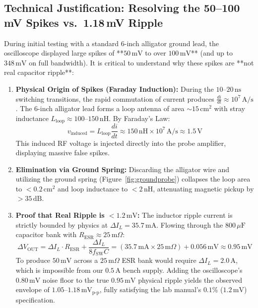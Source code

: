 \documentclass[11pt,a4paper]{article}
\begin{document}
\subsection{\texorpdfstring{Technical Justification: Resolving the 50--100\,mV Spikes vs.\ 1.18\,mV Ripple}{Technical Justification: Resolving the 50-100 mV Spikes vs 1.18 mV Ripple}}
During initial testing with a standard 6-inch alligator ground lead, the oscilloscope displayed large spikes of **$50\,\mathrm{mV}$ to over $100\,\mathrm{mV}$** (and up to $348\,\mathrm{mV}$ on full bandwidth). It is critical to understand why these spikes are **not real capacitor ripple**:
\begin{enumerate}
    \item \textbf{Physical Origin of Spikes (Faraday Induction):} During the $10\text{--}20\,\mathrm{ns}$ switching transitions, the rapid commutation of current produces $\frac{di}{dt} \approx 10^7\,\mathrm{A/s}$. The 6-inch alligator lead forms a loop antenna of area $\sim 15\,\mathrm{cm}^2$ with stray inductance $L_{\mathrm{loop}} \approx 100\text{--}150\,\mathrm{nH}$. By Faraday's Law:
    \begin{equation}
        v_{\mathrm{induced}} = L_{\mathrm{loop}} \frac{di}{dt} \approx 150\,\mathrm{nH} \times 10^7\,\mathrm{A/s} \approx \mathbf{1.5\,\mathrm{V}}
    \end{equation}
    This induced RF voltage is injected directly into the probe amplifier, displaying massive false spikes.
    \item \textbf{Elimination via Ground Spring:} Discarding the alligator wire and utilizing the ground spring (Figure~\ref{fig:groundprobe}) collapses the loop area to $<0.2\,\mathrm{cm}^2$ and loop inductance to $<2\,\mathrm{nH}$, attenuating magnetic pickup by $>35\,\mathrm{dB}$.
    \item \textbf{Proof that Real Ripple is $<1.2\,\mathrm{mV}$:} The inductor ripple current is strictly bounded by physics at $\Delta I_L = 35.7\,\mathrm{mA}$. Flowing through the $800\,\mu\mathrm{F}$ capacitor bank with $R_{\mathrm{ESR}} \approx 25\,\mathrm{m}\Omega$:
    \begin{equation}
        \Delta V_{\mathrm{OUT}} = \Delta I_L \cdot R_{\mathrm{ESR}} + \frac{\Delta I_L}{8 f_{\mathrm{SW}} C} = (35.7\,\mathrm{mA} \times 25\,\mathrm{m}\Omega) + 0.056\,\mathrm{mV} \approx \mathbf{0.95\,\mathrm{mV}}
    \end{equation}
    To produce $50\,\mathrm{mV}$ across a $25\,\mathrm{m}\Omega$ ESR bank would require $\Delta I_L = 2.0\,\mathrm{A}$, which is impossible from our $0.5\,\mathrm{A}$ bench supply. Adding the oscilloscope's $0.80\,\mathrm{mV}$ noise floor to the true $0.95\,\mathrm{mV}$ physical ripple yields the observed envelope of $\mathbf{1.05\text{--}1.18\,\mathrm{mV}_{\mathrm{p\text{-}p}}}$, fully satisfying the lab manual's $0.1\%$ ($1.2\,\mathrm{mV}$) specification.
\end{enumerate}
\end{document}
